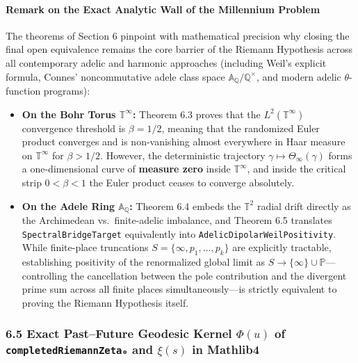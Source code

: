 \documentclass[
  11pt,
]{article}
\providecommand{\tightlist}{%
  \setlength{\itemsep}{0pt}\setlength{\parskip}{0pt}}
\begin{document}
\paragraph{Remark on the Exact Analytic Wall of the Millennium
Problem}\label{remark-on-the-exact-analytic-wall-of-the-millennium-problem}

The theorems of Section 6 pinpoint with mathematical precision why
closing the final open equivalence remains the core barrier of the
Riemann Hypothesis across all contemporary adelic and harmonic
approaches (including Weil's explicit formula, Connes' noncommutative
adele class space \(\mathbb{A}_\mathbb{Q}/\mathbb{Q}^\times\), and
modern adelic \(\theta\)-function programs):

\begin{itemize}
\tightlist
\item
  \textbf{On the Bohr Torus \(\mathbb{T}^\infty\):} Theorem 6.3 proves
  that the \(L^2(\mathbb{T}^\infty)\) convergence threshold is
  \(\beta = 1/2\), meaning that the randomized Euler product converges
  and is non-vanishing almost everywhere in Haar measure on
  \(\mathbb{T}^\infty\) for \(\beta > 1/2\). However, the deterministic
  trajectory \(\gamma \mapsto \Theta_\infty(\gamma)\) forms a
  one-dimensional curve of \textbf{measure zero} inside
  \(\mathbb{T}^\infty\), and inside the critical strip \(0 < \beta < 1\)
  the Euler product ceases to converge absolutely.
\item
  \textbf{On the Adele Ring \(\mathbb{A}_\mathbb{Q}\):} Theorem 6.4
  embeds the \(\mathbb{T}^2\) radial drift directly as the Archimedean
  vs.~finite-adelic imbalance, and Theorem 6.5 translates
  \texttt{SpectralBridgeTarget} equivalently into
  \texttt{AdelicDipolarWeilPositivity}. While finite-place truncations
  \(S = \{\infty, p_1, \dots, p_k\}\) are explicitly tractable,
  establishing positivity of the renormalized global limit as
  \(S \to \{\infty\} \cup \mathbb{P}\)---controlling the cancellation
  between the pole contribution and the divergent prime sum across all
  finite places simultaneously---is strictly equivalent to proving the
  Riemann Hypothesis itself.
\end{itemize}

\subsubsection{\texorpdfstring{6.5 Exact Past--Future Geodesic Kernel
\(\Phi(u)\) of \texttt{completedRiemannZeta₀} and \(\xi(s)\) in
Mathlib4}{6.5 Exact Past--Future Geodesic Kernel \textbackslash Phi(u) of completedRiemannZeta₀ and \textbackslash xi(s) in Mathlib4}}\label{exact-pastfuture-geodesic-kernel-phiu-of-completedriemannzetaux2080-and-xis-in-mathlib4}
\end{document}
